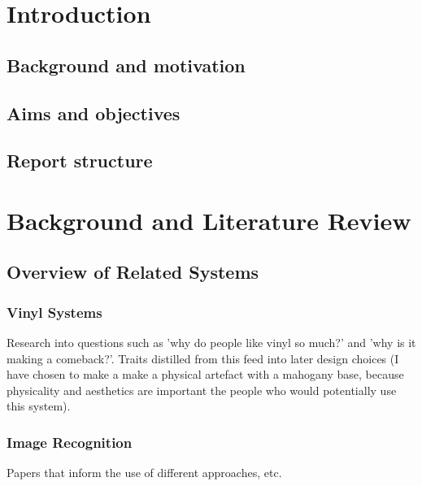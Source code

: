 \section{Introduction}

  \subsection{Background and motivation}
  
  \subsection{Aims and objectives}

  
  \subsection{Report structure} %


\section{Background and Literature Review} %

    \subsection{Overview of Related Systems}
        \subsubsection{Vinyl Systems}
            Research into questions such as 'why do people like vinyl so much?' and 'why is it making a comeback?'. Traits distilled from this feed into later design choices (I have chosen to make a make a physical artefact with a mahogany base, because physicality and aesthetics are important the people who would potentially use this system).

        \subsubsection{Image Recognition}
            Papers that inform the use of different approaches, etc.

